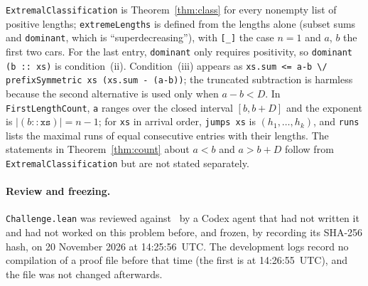 \documentclass[11pt]{article}
\theoremstyle{remark}
\begin{document}
{\texttt{ExtremalClassification} is Theorem~\ref{thm:class} for every nonempty
list of positive lengths; \texttt{extremeLengths} is defined from the lengths
alone (subset sums and \texttt{dominant}, which is ``superdecreasing''), with
\texttt{[\_]} the case $n=1$ and $a$, $b$ the first two cars. For the last entry,
\texttt{dominant} only requires positivity, so \texttt{dominant (b :: xs)} is
condition~(ii). Condition~(iii) appears as
\texttt{xs.sum <= a-b \textbackslash/ prefixSymmetric xs (xs.sum - (a-b))};
the truncated subtraction is harmless because the second alternative is used
only when $a-b<D$. In \texttt{FirstLengthCount}, \texttt{a} ranges over the
closed interval $[b,b+D]$ and the exponent is $|(b::\mathtt{xs})|=n-1$; for
\texttt{xs} in arrival order, \texttt{jumps xs} is $(h_1,\dots,h_k)$, and
\texttt{runs} lists the maximal runs of equal consecutive entries with their
lengths. The statements in Theorem~\ref{thm:count} about $a<b$ and $a>b+D$
follow from \texttt{ExtremalClassification} but are not stated separately.

\paragraph{Review and freezing.}
\texttt{Challenge.lean} was reviewed against~\cite{chen} by a Codex agent that
had not written it and had not worked on this problem before, and frozen, by
recording its SHA-256 hash, on 20 November 2026 at 14:25:56~UTC. The development
logs record no compilation of a proof file before that time (the first is at
14:26:55~UTC), and the file was not changed afterwards.

}
\end{document}
